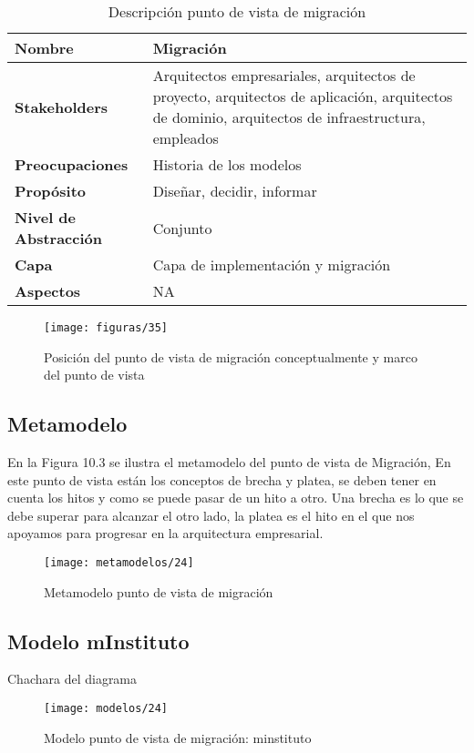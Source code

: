   \begin{table}[H]
	\centering
	\begin{tabular}{lp{8cm}}
		\toprule
		\textbf{Nombre} & \textbf{Migración} \\
		\midrule
		\textbf{Stakeholders} & Arquitectos empresariales, arquitectos de proyecto, arquitectos de aplicación, arquitectos de dominio, arquitectos de infraestructura, empleados \\
		\textbf{Preocupaciones} & Historia de los modelos \\
		\textbf{Propósito} & Diseñar, decidir, informar \\
		\textbf{Nivel de Abstracción} & Conjunto \\
		\textbf{Capa} & Capa de implementación y migración \\
		\textbf{Aspectos} & NA \\
		\bottomrule
	\end{tabular}
	\captionsetup{width=.95\textwidth}
	\caption{Descripción punto de vista de migración}
	\label{tabla27}
  \end{table}

  \begin{figure}[H]
	\centering
	\texttt{[image: figuras/35]}
	\captionsetup{width=.95\textwidth}
	\caption{Posición del punto de vista de migración conceptualmente y marco del punto de vista}
	\label{figura36}
  \end{figure}

  \subsection{Metamodelo}
  En la Figura 10.3 se ilustra el metamodelo del punto de vista de Migración, En este punto de vista están los conceptos de brecha y platea, se deben tener en cuenta los hitos y como se puede pasar de un hito a otro. Una brecha es lo que se debe superar para alcanzar el otro lado, la platea es el hito en el que nos apoyamos para progresar en la arquitectura empresarial.

  \begin{figure}[H]
	\centering
	\texttt{[image: metamodelos/24]}
	\captionsetup{width=.95\textwidth}
	\caption{Metamodelo punto de vista de migración}
	\label{metamodelo24}
  \end{figure}

  \subsection{Modelo mInstituto}Chachara del diagrama
  \begin{figure}[H]
	\centering
	\texttt{[image: modelos/24]}
	\captionsetup{width=.95\textwidth}
	\caption{Modelo punto de vista de migración: minstituto}
	\label{modelo24}
  \end{figure}
  
